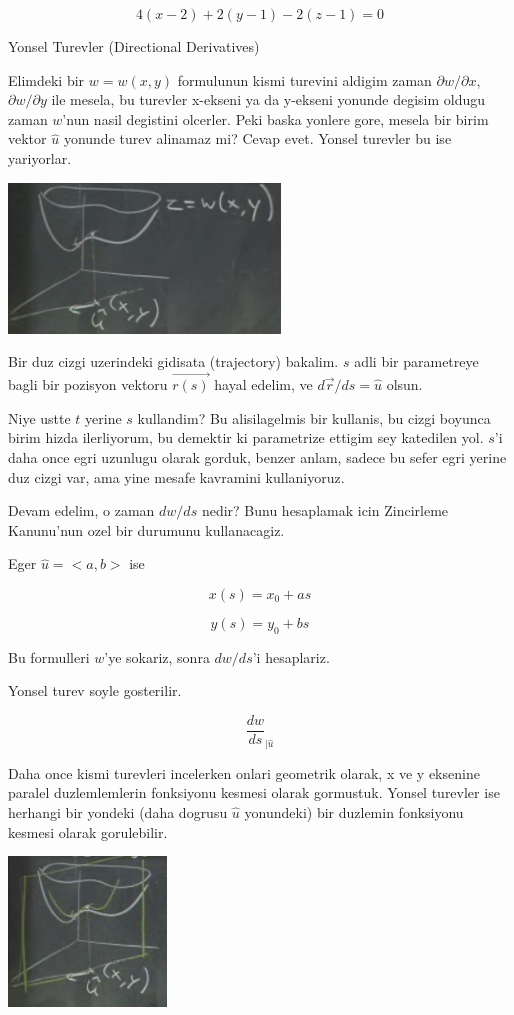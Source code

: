\documentclass[12pt,fleqn]{article}
\begin{document}
\[ 4(x-2) + 2(y-1) - 2(z-1) = 0 \]

Yonsel Turevler (Directional Derivatives) 

Elimdeki bir $w = w(x,y)$ formulunun kismi turevini aldigim zaman 
$\partial  w/\partial x$, $\partial w/\partial y$ ile mesela, bu turevler x-ekseni ya da y-ekseni 
yonunde degisim oldugu zaman $w$'nun nasil degistini olcerler. Peki baska
yonlere gore, mesela bir birim vektor $\hat{u}$ yonunde turev alinamaz mi? 
Cevap evet. Yonsel turevler bu ise yariyorlar. 

\includegraphics[height=4cm]{12_6.png}

Bir duz cizgi uzerindeki gidisata (trajectory) bakalim. $s$ adli bir
parametreye bagli bir pozisyon vektoru $\vec{r(s)}$ hayal edelim, ve
$d\vec{r}/ds = \hat{u}$ olsun. 

Niye ustte $t$ yerine $s$ kullandim? Bu alisilagelmis bir kullanis, bu
cizgi boyunca birim hizda ilerliyorum, bu demektir ki parametrize ettigim
sey katedilen yol. $s$'i daha once egri uzunlugu olarak gorduk, benzer
anlam, sadece bu sefer egri yerine duz cizgi var, ama yine mesafe kavramini
kullaniyoruz. 

Devam edelim, o zaman $dw/ds$ nedir? Bunu hesaplamak icin Zincirleme
Kanunu'nun ozel bir durumunu kullanacagiz. 

Eger $\hat{u} = <a,b>$ ise

\[ x(s) = x_0 + as \]

\[ y(s) = y_0 + bs \]

Bu formulleri $w$'ye sokariz, sonra $dw/ds$'i hesaplariz. 

Yonsel turev soyle gosterilir.

\[ \frac{dw}{ds}_{|\hat{u}} \]

Daha once kismi turevleri incelerken onlari geometrik olarak, x ve y
eksenine paralel duzlemlemlerin fonksiyonu kesmesi olarak
gormustuk. Yonsel turevler ise herhangi bir yondeki (daha dogrusu $\hat{u}$
yonundeki) bir duzlemin fonksiyonu kesmesi olarak gorulebilir.

\includegraphics[height=4cm]{12_7.png}
\end{document}
